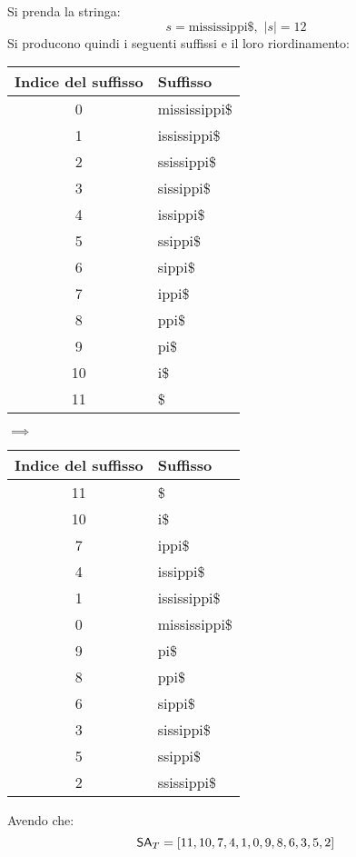 \begin{esempio}
  Si prenda la stringa:
  \[s=\mbox{mississippi\$},\,\,|s|=12\]
  Si producono quindi i seguenti suffissi e il loro riordinamento:
  \begin{table}[H]
    \footnotesize
    \centering
    \begin{tabular}{c|l}
      \textbf{Indice del suffisso} & \textbf{Suffisso}\\
      \hline
      0 & mississippi\$\\
      1 & ississippi\$\\
      2 & ssissippi\$\\
      3 & sissippi\$\\
      4 & issippi\$\\
      5 & ssippi\$\\
      6 & sippi\$\\
      7 & ippi\$\\
      8 & ppi\$\\
      9 & pi\$\\
      10 & i\$\\
      11 & \$\\
    \end{tabular}
    \quad $\implies$\quad
    \begin{tabular}{c|l} 
      \textbf{Indice del suffisso} & \textbf{Suffisso}\\ 
      \hline
      11 & \$\\
      10 & i\$\\
      7 & ippi\$\\
      4 & issippi\$\\
      1 & ississippi\$\\
      0 & mississippi\$\\
      9 & pi\$\\
      8 & ppi\$\\
      6 & sippi\$\\
      3 & sissippi\$\\
      5 & ssippi\$\\
      2 & ssissippi\$\\
    \end{tabular}
  \end{table}
  Avendo che:
  \[\mbox{\rm {\sf SA}}_T=[11,10,7,4,1,0,9,8,6,3,5,2]\]
\end{esempio}

